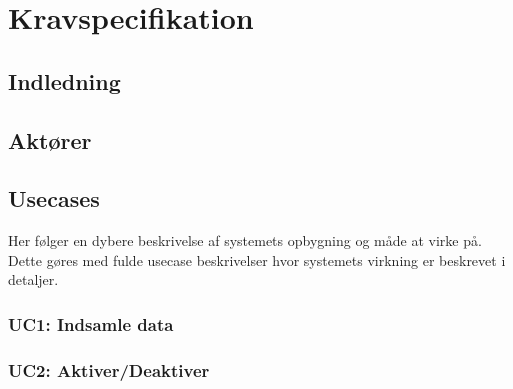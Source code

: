 \chapter{Kravspecifikation}

\clearpage


\section{Indledning}



\section{Aktører}



\section{Usecases}

Her følger en dybere beskrivelse af systemets opbygning og måde at virke på. Dette gøres med fulde usecase beskrivelser hvor systemets virkning er beskrevet i detaljer.

%


\subsection{UC1: Indsamle data}



\subsection{UC2: Aktiver/Deaktiver}


